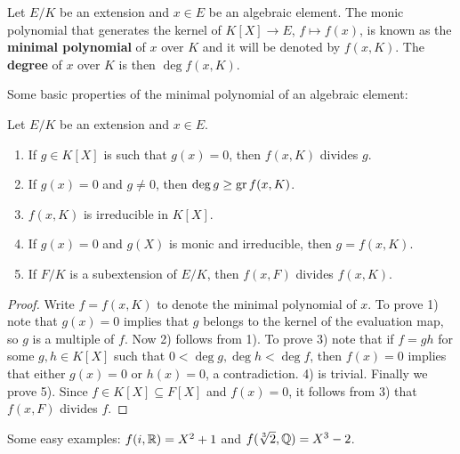 \begin{definition}
	Let $E/K$ be an extension and $x\in E$ be an algebraic element.  The monic
	polynomial that generates the kernel of $K[X]\to E$, $f\mapsto f(x)$, is
	known as the \textbf{minimal polynomial} of $x$ over $K$ and it will be
	denoted by $f(x,K)$. The \textbf{degree} of $x$ over $K$ is then $\deg
	f(x,K)$. 
\end{definition}

Some basic properties of the minimal polynomial of an algebraic element:

\begin{proposition}
	Let $E/K$ be an extension and $x\in E$. 
	\begin{enumerate}
		\item If $g\in K[X]$ is such that $g(x)=0$, then $f(x,K)$ divides $g$. 
		\item If $g(x)=0$ and $g\ne 0$, then $\deg g\geq\operatorname{gr} f(x,K)$.
		\item $f(x,K)$ is irreducible in $K[X]$.
		\item If $g(x)=0$ and $g(X)$ is monic and irreducible, then
			$g=f(x,K)$. 
		\item If $F/K$ is a subextension of $E/K$, then $f(x,F)$ divides
			$f(x,K)$. 
	\end{enumerate}
\end{proposition}

\begin{proof}
	Write $f=f(x,K)$ to denote the minimal polynomial of $x$. 
	To prove 1) note that $g(x)=0$ implies that	$g$ belongs to the kernel of
	the evaluation map, so $g$ is a multiple of $f$. Now 2) follows from
	1). To prove 3) note that if $f=gh$ for some $g,h\in K[X]$ such that
	$0<\deg g,\deg h<\deg f$, then $f(x)=0$ implies that 
	either $g(x)=0$ or $h(x)=0$, a
	contradiction. 4) is trivial. Finally we prove 5). Since $f\in K[X]\subseteq F[X]$ 
	and $f(x)=0$, it follows from 3) that $f(x,F)$ divides $f$. 
\end{proof}

Some easy examples: $f(i,\mathbb{R})=X^2+1$ and 
$f(\sqrt[3]{2},\mathbb{Q})=X^3-2$. 

